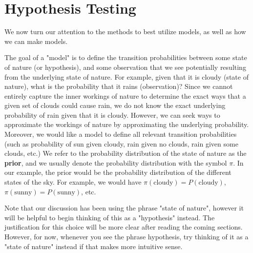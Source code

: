 \section{Hypothesis Testing}

We now turn our attention to the methods to best utilize models, as well as how we can make models. \newline 

The goal of a "model" is to define the transition probabilities between some state of nature (or hypothesis), and some observation that we see potentially resulting from the underlying state of nature. For example, given that it is cloudy (state of nature), what is the probability that it rains (observation)? Since we cannot entirely capture the inner workings of nature to determine the exact ways that a given set of clouds could cause rain, we do not know the exact underlying probability of rain given that it is cloudy. However, we can seek ways to approximate the workings of nature by approximating the underlying probability. Moreover, we would like a model to define all relevant transition probabilities (such as probability of sun given cloudy, rain given no clouds, rain given some clouds, etc.) We refer to the probability distribution of the state of nature as the \textbf{prior}, and we usually denote the probability distribution with the symbol \(\pi\). In our example, the prior would be the probability distribution of the different states of the sky. For example, we would have \(\pi(\textrm{cloudy}) = P(\textrm{cloudy})\), \(\pi(\textrm{sunny}) = P(\textrm{sunny})\), etc. \newline 

Note that our discussion has been using the phrase "state of nature", however it will be helpful to begin thinking of this as a "hypothesis" instead. The justification for this choice will be more clear after reading the coming sections. However, for now, whenever you see the phrase hypothesis, try thinking of it as a "state of nature" instead if that makes more intuitive sense.

